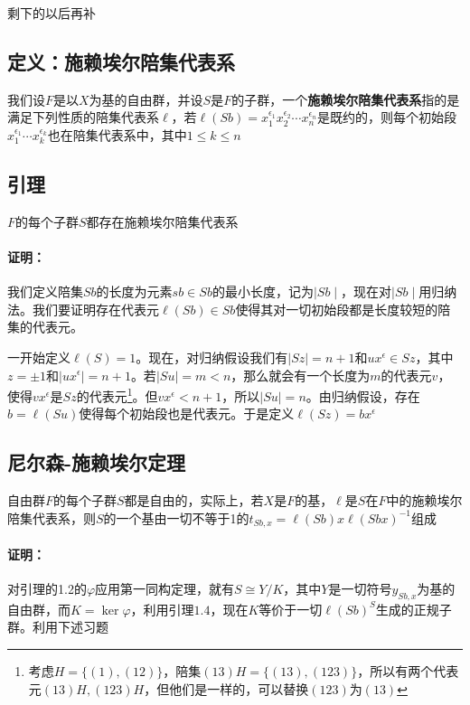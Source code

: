 \documentclass[UTF8]{article}
\begin{document}
	剩下的以后再补
	
	\subsection{定义：施赖埃尔陪集代表系}
	
	我们设$F$是以$X$为基的自由群，并设$S$是$ F$的子群，一个\textbf{施赖埃尔陪集代表系}指的是满足下列性质的陪集代表系$\ell$，若$\ell(Sb) = x^{\epsilon_1}_1 x^{\epsilon_2}_2\cdots x_n^{\epsilon_n}$是既约的，则每个初始段$x_1^{\epsilon_1}\cdots x_k^{\epsilon_k}$也在陪集代表系中，其中$1\leq k \leq n$
	
	\subsection{引理}
	$F$的每个子群$S$都存在施赖埃尔陪集代表系
	
	\paragraph{证明：} 我们定义陪集$Sb$的长度为元素$sb\in Sb$的最小长度，记为$\mid Sb\mid $，现在对$\mid Sb\mid $用归纳法。我们要证明存在代表元$\ell(Sb)\in Sb$使得其对一切初始段都是长度较短的陪集的代表元。
	
	一开始定义$\ell(S) = 1$。现在，对归纳假设我们有$\mid Sz \mid = n+1$和$ux^\epsilon \in Sz$，其中$z  =\pm 1$和$\mid ux^\epsilon\mid = n+1$。若$\mid Su\mid = m < n$，那么就会有一个长度为$m$的代表元$v$，使得$vx^\epsilon$是$Sz$的代表元\footnote{考虑$H = \{(1),(12)\}$，陪集$(13)H = \{(13),(123)\}$，所以有两个代表元$(13)H,(123)H$，但他们是一样的，可以替换$(123)$为$(13)$}。但$vx^\epsilon<n+1$，所以$\mid Su\mid = n$。由归纳假设，存在$b=\ell(Su)$使得每个初始段也是代表元。于是定义$\ell(Sz) = bx^\epsilon$
	
	\subsection{尼尔森-施赖埃尔定理}
	
	自由群$F$的每个子群$S$都是自由的，实际上，若$X$是$F$的基，$\ell$是$S$在$F$中的施赖埃尔陪集代表系，则$S$的一个基由一切不等于1的$t_{Sb,x} = \ell(Sb)x\ell(Sbx)^{-1}$组成
	
	\newpage
	\paragraph{证明：} 对引理的1.2的$\varphi$应用第一同构定理，就有$S\cong Y/K$，其中$Y$是一切符号$y_{Sb,x}$为基的自由群，而$K = \ker\varphi$，利用引理$1.4$，现在$K$等价于一切$\ell(Sb)^S$生成的正规子群。利用下述习题
	
\end{document}
